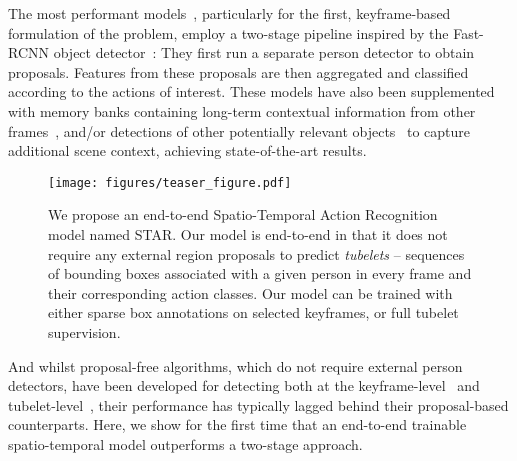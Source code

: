 \documentclass[10pt,twocolumn,letterpaper]{article}
\begin{document}
The most performant models~\cite{pan2021actor,arnab2022beyond,wu2022memvit,feichtenhofer_iccv_2019}, particularly for the first, keyframe-based formulation of the problem, employ a two-stage pipeline inspired by the Fast-RCNN object detector~\cite{girshick_iccv_2015}:
They first run a separate person detector to obtain proposals. Features from these proposals are then aggregated and classified according to the actions of interest.
These models have also been supplemented with memory banks containing long-term contextual information from other frames~\cite{wu_cvpr_2019,wu2022memvit,pan2021actor,tang2020asynchronous}, and/or detections of other potentially relevant objects~\cite{tang2020asynchronous,arnab2021unified} to capture additional scene context, achieving state-of-the-art results.

\begin{figure}[t]
	\vspace{-0.5\baselineskip}
	\texttt{[image: figures/teaser\_figure.pdf]}
	\label{fig:teaser}
	\vspace{-\baselineskip}
	\caption{
		We propose an end-to-end Spatio-Temporal Action Recognition model named STAR.
		Our model is end-to-end in that it does not require any external region proposals to predict \textit{tubelets} -- sequences of bounding boxes associated with a given person in every frame and their corresponding action classes.
	Our model can be trained with either sparse box annotations on selected keyframes, or full tubelet supervision. 
	}
	\vspace{-1.5\baselineskip}
\end{figure} 
And whilst proposal-free algorithms, which do not require external person detectors, have been developed for detecting both at the keyframe-level~\cite{kopuklu2019you, chen2021watch, sun_eccv_2018} and tubelet-level~\cite{kalogeiton_iccv_2017, zhao2022tuber}, their performance has typically lagged behind their proposal-based counterparts. Here, we show for the first time that an end-to-end trainable spatio-temporal model outperforms a two-stage approach. 
\end{document}
